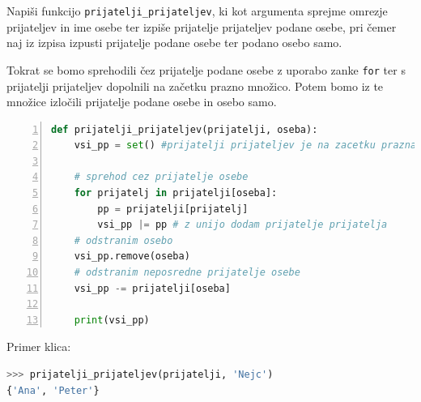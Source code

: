 \begin{zgled}
Napiši funkcijo \texttt{prijatelji\_prijateljev}, ki kot argumenta sprejme omrezje prijateljev in ime osebe ter izpiše prijatelje prijateljev podane osebe, pri čemer naj iz izpisa izpusti prijatelje podane osebe ter podano osebo samo.
\end{zgled}
\begin{resitev}
Tokrat se bomo sprehodili čez prijatelje podane osebe z uporabo zanke \texttt{for} ter s prijatelji prijateljev dopolnili na začetku prazno množico. Potem bomo iz te množice izločili prijatelje podane osebe in osebo samo.
\begin{lstlisting}[language=Python,numbers=left]
def prijatelji_prijateljev(prijatelji, oseba):
    vsi_pp = set() #prijatelji prijateljev je na zacetku prazna
    
    # sprehod cez prijatelje osebe
    for prijatelj in prijatelji[oseba]:
        pp = prijatelji[prijatelj]
        vsi_pp |= pp # z unijo dodam prijatelje prijatelja
    # odstranim osebo
    vsi_pp.remove(oseba)
    # odstranim neposredne prijatelje osebe
    vsi_pp -= prijatelji[oseba]
    
    print(vsi_pp)

\end{lstlisting}
Primer klica:
\begin{lstlisting}[language=Python]
>>> prijatelji_prijateljev(prijatelji, 'Nejc')
{'Ana', 'Peter'}
\end{lstlisting}
\end{resitev}


